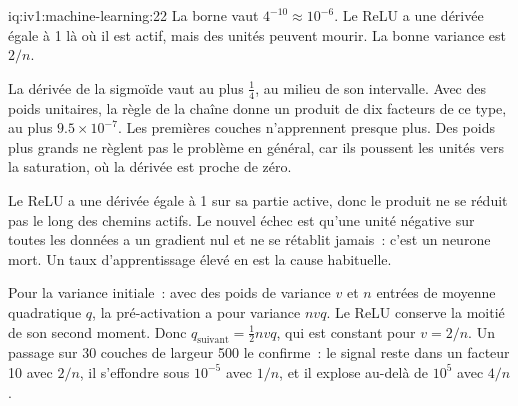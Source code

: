 \begin{solution}{iq:iv1:machine-learning:22}
La borne vaut $4^{-10} \approx 10^{-6}$. Le ReLU a une dérivée égale à 1 là où il est actif, mais des unités peuvent mourir. La bonne variance est $2/n$.

La dérivée de la sigmoïde vaut au plus $\frac14$, au milieu de son intervalle. Avec des poids unitaires, la règle de la chaîne donne un produit de dix facteurs de ce type, au plus $9.5 \times 10^{-7}$. Les premières couches n'apprennent presque plus. Des poids plus grands ne règlent pas le problème en général, car ils poussent les unités vers la saturation, où la dérivée est proche de zéro.

Le ReLU a une dérivée égale à 1 sur sa partie active, donc le produit ne se réduit pas le long des chemins actifs. Le nouvel échec est qu'une unité négative sur toutes les données a un gradient nul et ne se rétablit jamais~: c'est un neurone mort. Un taux d'apprentissage élevé en est la cause habituelle.

Pour la variance initiale~: avec des poids de variance $v$ et $n$ entrées de moyenne quadratique $q$, la pré-activation a pour variance $nvq$. Le ReLU conserve la moitié de son second moment. Donc $q_{\text{suivant}} = \frac12 nvq$, qui est constant pour $v = 2/n$. Un passage sur 30 couches de largeur 500 le confirme~: le signal reste dans un facteur 10 avec $2/n$, il s'effondre sous $10^{-5}$ avec $1/n$, et il explose au-delà de $10^5$ avec $4/n$.



\end{solution}

